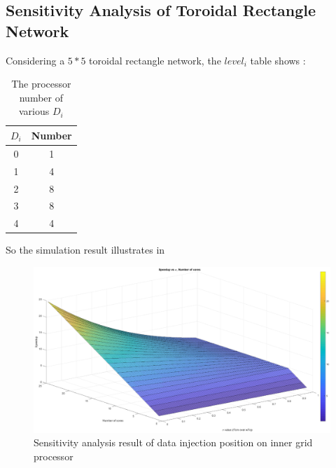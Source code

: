 \subsection{Sensitivity Analysis of Toroidal Rectangle Network}
Considering a $5*5$ toroidal rectangle network, the $level_{i}$ table shows :
\begin{table}
\centering
\small
\setlength\tabcolsep{2pt}
\begin{tabular}{|c|c|}
\hline
    $D_{i}$ & Number\\ 
    \hline
    0 & 1 \\ \hline
    1 & 4 \\ \hline
    2 & 8\\ \hline
    3 & 8\\ \hline
    4 & 4 \\ \hline
\end{tabular}
\caption{The processor number of various $D_{i}$}
\label{tab:dn}
\end{table}

So the simulation result illustrates in 
\begin{figure}[!ht]
\centering
\includegraphics[width=1\columnwidth]{figure/sa5t5_torus.eps}
\caption{Sensitivity analysis result of data injection position on inner grid processor}
\label{fig:sa5t5_torus}
\end{figure}